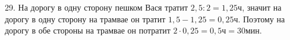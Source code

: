 29. На дорогу в одну сторону пешком Вася тратит $2,5:2=1,25$ч, значит на дорогу в одну сторону на трамвае он тратит $1,5-1,25=0,25$ч. Поэтому на дорогу в обе стороны на трамвае он потратит $2\cdot0,25=0,5$ч$=30$мин.\\
